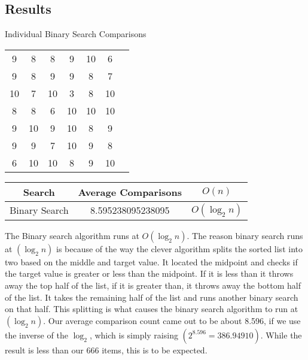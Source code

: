 \documentclass{article}
\begin{document}
\subsection{Results}
\begin{center}
Individual Binary Search Comparisons

\vspace{2mm}
\begin{tabular}{ c c c c c c c }
9 & 8 & 8 & 9 & 10 & 6\\
9 & 8 & 9 & 9 & 8 & 7 \\
10 & 7 & 10 & 3 & 8 & 10\\
8 & 8 & 6 & 10 & 10 & 10\\
9 & 10 & 9 & 10 & 8 & 9\\
9 & 9 & 7 & 10 & 9 & 8 \\
6 & 10 & 10 & 8 & 9 & 10 
\end{tabular}
\end{center}
\begin{tabular}{c|c|c}
    Search & Average Comparisons & $O(n)$ \\
\hline
    Binary Search & 8.595238095238095 & $O(\log_2n)$
\end{tabular}
\vspace{5mm}

The Binary search algorithm runs at $O(\log_2n)$. The reason binary search runs at $(\log_2n)$ is because of the way the clever algorithm splits the sorted list into two based on the middle and target value. It located the midpoint and checks if the target value is greater or less than the midpoint. If it is less than it throws away the top half of the list, if it is greater than, it throws away the bottom half of the list. It takes the remaining half of the list and runs another binary search on that half. This splitting is what causes the binary search algorithm to run at $(\log_2n)$. Our average comparison count came out to be about 8.596, if we use the inverse of the $\log_2$, which is simply raising $(2^8.596 = 386.94910)$. While the result is less than our 666 items, this is to be expected.

\newpage
\end{document}
